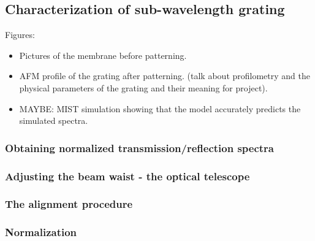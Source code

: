 \subsection{Characterization of sub-wavelength grating}

Figures:
\begin{itemize}
    \item Pictures of the membrane before patterning.
    \item AFM profile of the grating after patterning. (talk about profilometry and the physical parameters of the grating and their meaning for project).
    \item MAYBE: MIST simulation showing that the model accurately predicts the simulated spectra.
\end{itemize}

\subsubsection{Obtaining normalized transmission/reflection spectra}

\subsubsection{Adjusting the beam waist - the optical telescope}

\subsubsection{The alignment procedure}

\subsubsection{Normalization}
